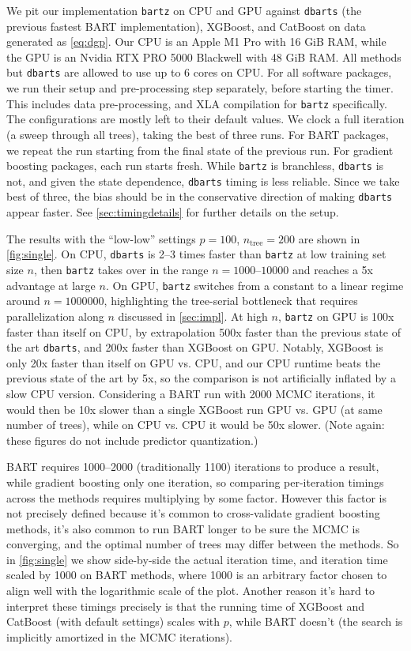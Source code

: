 \documentclass{article}
\begin{document}
We pit our implementation \texttt{bartz} on CPU and GPU against \texttt{dbarts}
(the previous fastest BART implementation), XGBoost, and
CatBoost on data generated as \autoref{eq:dgp}. Our CPU is an Apple M1
Pro with 16 GiB RAM, while the GPU is an Nvidia RTX PRO 5000 Blackwell with 48
GiB RAM. All methods but \texttt{dbarts} are allowed to use up to 6 cores on CPU.
For all software packages, we run their setup and pre-processing step
separately, before starting the timer. This includes data pre-processing, and
XLA compilation for \texttt{bartz} specifically. The configurations are mostly
left to their default values. We clock a full iteration (a sweep through all
trees), taking the best of three runs. For BART packages, we repeat the run
starting from the final state of the previous run. For gradient boosting
packages, each run starts fresh. While \texttt{bartz} is branchless,
\texttt{dbarts} is not, and given the state dependence, \texttt{dbarts} timing
is less reliable. Since we take best of three, the bias should be in the
conservative direction of making \texttt{dbarts} appear faster.
See \autoref{sec:timingdetails} for further details on the setup.

The results with the ``low-low'' settings $p=100$, $n_\text{tree}=200$ are
shown in \autoref{fig:single}. On CPU, \texttt{dbarts} is 2--3
times faster than \texttt{bartz} at low training set size $n$, then
\texttt{bartz} takes over in the range $n=\num{1000}\text{--} \num{10000}$ and
reaches a 5x advantage at large $n$. On GPU, \texttt{bartz} switches from a
constant to a linear regime around $n = \num{1000000}$, highlighting the
tree-serial bottleneck that requires parallelization along $n$ discussed in
\autoref{sec:impl}. At high $n$, \texttt{bartz} on GPU is 100x faster than
itself on CPU, by extrapolation 500x faster than the previous state of the art
\texttt{dbarts}, and 200x faster than XGBoost on GPU. Notably, XGBoost is only
20x faster than itself on GPU vs.{} CPU, and our CPU runtime beats the previous
state of the art by 5x, so the comparison is not artificially inflated by a
slow CPU version. Considering a BART run with 2000 MCMC iterations, it would
then be 10x slower than a single XGBoost run GPU vs.{} GPU (at same number of
trees), while on CPU vs.{} CPU it would be 50x slower. (Note again: these
figures do not include predictor quantization.)

BART requires 1000--2000 (traditionally 1100) iterations to produce a result,
while gradient boosting only one iteration, so comparing per-iteration timings
across the methods requires multiplying by some factor. However this factor is
not precisely defined because it's common to cross-validate gradient boosting
methods, it's also common to run BART longer to be sure the MCMC is converging,
and the optimal number of trees may differ between the methods. So in
\autoref{fig:single} we show side-by-side the actual iteration time, and
iteration time scaled by 1000 on BART methods, where 1000 is an arbitrary
factor chosen to align well with the logarithmic scale of the plot. Another
reason it's hard to interpret these timings precisely is that the running time
of XGBoost and CatBoost (with default settings) scales with $p$, while BART
doesn't (the search is implicitly amortized in the MCMC iterations).
\end{document}
